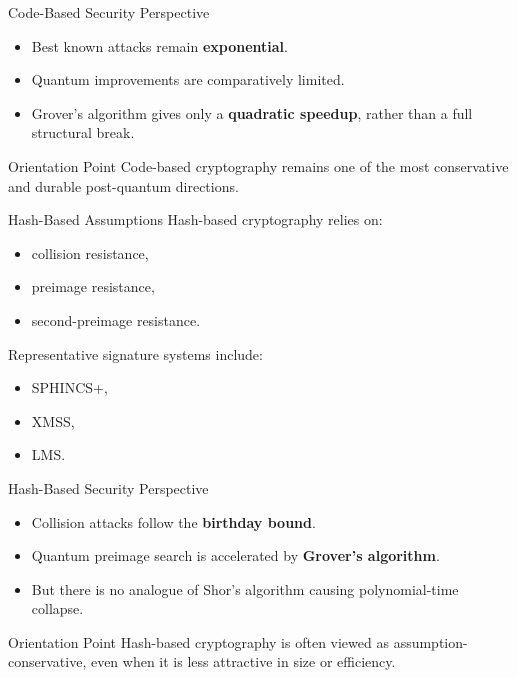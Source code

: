 \documentclass[aspectratio=169]{beamer}
\begin{document}
	\begin{frame}{Code-Based Security Perspective}
		\begin{itemize}
			\item Best known attacks remain \textbf{exponential}.
			\item Quantum improvements are comparatively limited.
			\item Grover's algorithm gives only a \textbf{quadratic speedup}, rather than a full structural break.
		\end{itemize}
		
		\begin{block}{Orientation Point}
			Code-based cryptography remains one of the most conservative and durable post-quantum directions.
		\end{block}
	\end{frame}
	
	\begin{frame}{Hash-Based Assumptions}
		Hash-based cryptography relies on:
		\begin{itemize}
			\item collision resistance,
			\item preimage resistance,
			\item second-preimage resistance.
		\end{itemize}
		
		Representative signature systems include:
		\begin{itemize}
			\item SPHINCS+,
			\item XMSS,
			\item LMS.
		\end{itemize}
	\end{frame}
	
	\begin{frame}{Hash-Based Security Perspective}
		\begin{itemize}
			\item Collision attacks follow the \textbf{birthday bound}.
			\item Quantum preimage search is accelerated by \textbf{Grover's algorithm}.
			\item But there is no analogue of Shor's algorithm causing polynomial-time collapse.
		\end{itemize}
		
		\begin{block}{Orientation Point}
			Hash-based cryptography is often viewed as assumption-conservative, even when it is less attractive in size or efficiency.
		\end{block}
	\end{frame}
	
\end{document}

